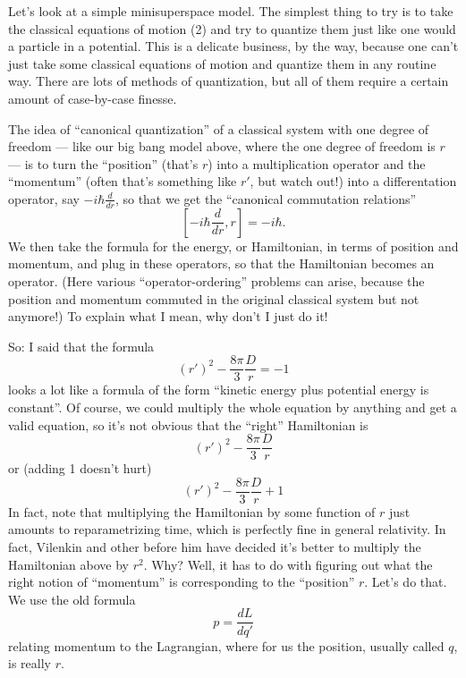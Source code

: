 \documentclass[12pt]{article}
\begin{document}
Let's look at a simple minisuperspace model. The simplest thing to try
is to take the classical equations of motion (2) and try to quantize
them just like one would a particle in a potential. This is a delicate
business, by the way, because one can't just take some classical
equations of motion and quantize them in any routine way. There are lots
of methods of quantization, but all of them require a certain amount of
case-by-case finesse.

The idea of ``canonical quantization'' of a classical system with one
degree of freedom --- like our big bang model above, where the one
degree of freedom is \(r\) --- is to turn the ``position'' (that's
\(r\)) into a multiplication operator and the ``momentum'' (often that's
something like \(r'\), but watch out!) into a differentation operator,
say \(-i \hbar \frac{d}{dr}\), so that we get the ``canonical
commutation relations'' \[[-i \hbar \frac{d}{dr}, r] = -i \hbar.\] We
then take the formula for the energy, or Hamiltonian, in terms of
position and momentum, and plug in these operators, so that the
Hamiltonian becomes an operator. (Here various ``operator-ordering''
problems can arise, because the position and momentum commuted in the
original classical system but not anymore!) To explain what I mean, why
don't I just do it!

So: I said that the formula
\[(r')^2-\frac{8\pi}{3} \frac{D}{r} = -1 \tag{3}\] looks a lot like a
formula of the form ``kinetic energy plus potential energy is
constant''. Of course, we could multiply the whole equation by anything
and get a valid equation, so it's not obvious that the ``right''
Hamiltonian is \[(r')^2-\frac{8\pi}{3} \frac{D}{r}\] or (adding 1
doesn't hurt) \[(r')^2-\frac{8\pi}{3} \frac{D}{r} + 1\] In fact, note
that multiplying the Hamiltonian by some function of \(r\) just amounts
to reparametrizing time, which is perfectly fine in general relativity.
In fact, Vilenkin and other before him have decided it's better to
multiply the Hamiltonian above by \(r^2\). Why? Well, it has to do with
figuring out what the right notion of ``momentum'' is corresponding to
the ``position'' \(r\). Let's do that. We use the old formula
\[p = \frac{dL}{dq'}\] relating momentum to the Lagrangian, where for us
the position, usually called \(q\), is really \(r\).
\end{document}

